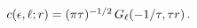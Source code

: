 $\mathop{c\/}\nolimits\!\left(\epsilon,\ell;r\right)=(\pi\tau)^{-1/2}\mathop{G_%
{\ell}\/}\nolimits\!\left(-1/\tau,\tau r\right).$